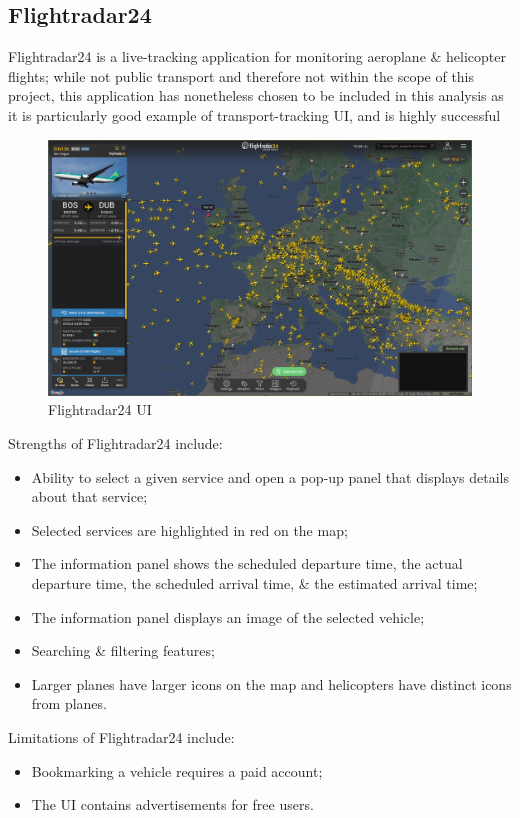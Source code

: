 \documentclass[a4paper,11pt]{report}
\begin{document}
\subsection{Flightradar24}
Flightradar24\supercite{radar} is a live-tracking application for monitoring aeroplane \& helicopter flights;
while not public transport and therefore not within the scope of this project, this application has nonetheless chosen to be included in this analysis as it is particularly good example of transport-tracking UI, and is highly successful
\begin{figure}[H]
    \centering
    \includegraphics[width=\textwidth]{../PDD/images/flightradar.png}
    \caption{Flightradar24 UI}
\end{figure}

Strengths of Flightradar24 include:
\begin{itemize}
    \item   Ability to select a given service and open a pop-up panel that displays details about that service;
    \item   Selected services are highlighted in red on the map;
    \item   The information panel shows the scheduled departure time, the actual departure time, the scheduled arrival time, \& the estimated arrival time;
    \item   The information panel displays an image of the selected vehicle;
    \item   Searching \& filtering features;
    \item   Larger planes have larger icons on the map and helicopters have distinct icons from planes.
\end{itemize}

Limitations of Flightradar24 include:
\begin{itemize}
    \item   Bookmarking a vehicle requires a paid account;
    \item   The UI contains advertisements for free users.
\end{itemize}
\end{document}
